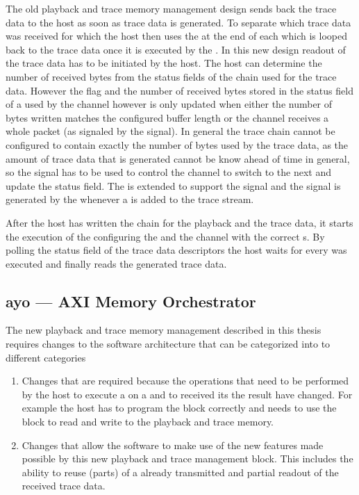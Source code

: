 The old playback and trace memory management design sends back the trace data to the host as soon as trace data is generated. To separate which trace data was received for which \PlaybackProgram{} the host then uses the \haltInstr{} at the end of each \PlaybackProgram{} which is looped back to the trace data once it is executed by the \pbexec{}.
In this new design readout of the trace data has to be initiated by the host. The host can determine the number of received bytes from the status fields of the \descriptor{} chain used for the trace data.
However the \completed{} flag and the number of received bytes stored in the status field of a \descriptor{} used by the \SToMM{} channel however is only updated when either the number of bytes written matches the configured buffer length or the \SToMM{} channel receives a whole packet (as signaled by the \TLAST{} signal). In general the trace \descriptor{} chain cannot be configured to contain exactly the number of bytes used by the trace data, as the amount of trace data that is generated cannot be know ahead of time in general, so the \TLAST{} signal has to be used to control the \SToMM{} channel to switch to the next \descriptor{} and update the status field.
The \UTEncoder{} is extended to support the \TLAST{} signal and the \TLAST{} signal is generated by the \pbexec{} whenever a \haltInstr{} is added to the trace stream.

After the host has written the \descriptor{} chain for the playback and the trace data, it starts the execution of the \PlaybackProgram{} configuring the \SToMM{} and the \MMToS{} channel with the correct \descriptor{}s.
By polling the status field of the trace data descriptors the host waits for every \PlaybackProgram{} was executed and finally reads the generated trace data.
\subsection{ayo --- AXI Memory Orchestrator}
The new playback and trace memory management described in this thesis requires changes to the \BSSTwo{} software architecture that can be categorized into to different categories
\begin{enumerate}
\item Changes that are required because the operations that need to be performed by the host to execute a \PlaybackProgram{} on a \FPGA{} and to received its the result have changed. For example the host has to program the \AXIDMA{} block correctly and needs to use the \FAXI{} block to read and write to the playback and trace memory.
\item Changes that allow the software to make use of the new features made possible by this new playback and trace management block. This includes the ability to reuse (parts) of a already transmitted \PlaybackProgram{} and partial readout of the received trace data.
\end{enumerate}

